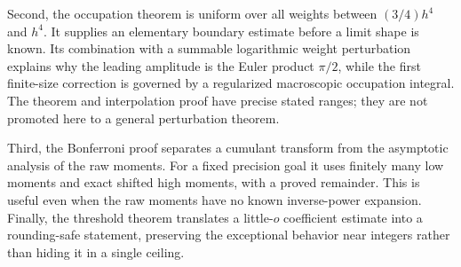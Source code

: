 \documentclass[11pt,letterpaper]{article}
\numberwithin{equation}{section}
\theoremstyle{remark}\newtheorem{remark}[theorem]{Remark}
\begin{document}
Second, the occupation theorem is uniform over all weights between $(3/4)h^4$ and $h^4$. It supplies an elementary boundary estimate before a limit shape is known. Its combination with a summable logarithmic weight perturbation explains why the leading amplitude is the Euler product $\pi/2$, while the first finite-size correction is governed by a regularized macroscopic occupation integral. The theorem and interpolation proof have precise stated ranges; they are not promoted here to a general perturbation theorem.

Third, the Bonferroni proof separates a cumulant transform from the asymptotic analysis of the raw moments. For a fixed precision goal it uses finitely many low moments and exact shifted high moments, with a proved remainder. This is useful even when the raw moments have no known inverse-power expansion. Finally, the threshold theorem translates a little-$o$ coefficient estimate into a rounding-safe statement, preserving the exceptional behavior near integers rather than hiding it in a single ceiling.
\end{document}
